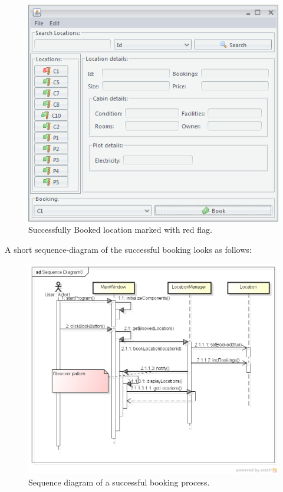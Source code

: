 \begin{figure}[H]
\begin{center}
\includegraphics[scale=0.75]{gfx/location_booked.png} 
\end{center}
\caption{Successfully Booked location marked with red flag.}
\label{fig:booked_location}
\end{figure}

A short sequence-diagram of the successful booking looks as follows:

\begin{figure}[H]
\begin{center}
\includegraphics[width=\textwidth]{gfx/booking_sequence.png} 
\end{center}
\caption{Sequence diagram of a successful booking process.}
\label{fig:booking_sequence}
\end{figure}

